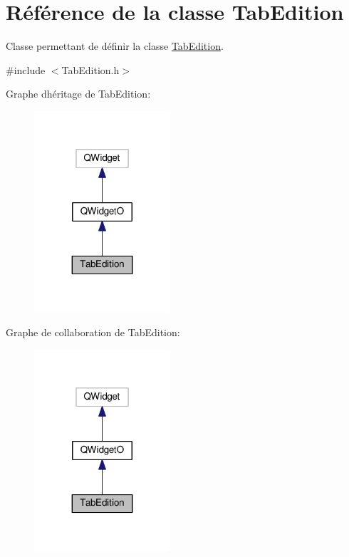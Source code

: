 \hypertarget{class_tab_edition}{}\section{Référence de la classe Tab\+Edition}
\label{class_tab_edition}


Classe permettant de définir la classe \hyperlink{class_tab_edition}{Tab\+Edition}.  




{\ttfamily \#include $<$Tab\+Edition.\+h$>$}



Graphe d\textquotesingle{}héritage de Tab\+Edition\+:\nopagebreak
\begin{figure}[H]
\begin{center}
\leavevmode
\includegraphics[width=143pt]{class_tab_edition__inherit__graph}
\end{center}
\end{figure}


Graphe de collaboration de Tab\+Edition\+:\nopagebreak
\begin{figure}[H]
\begin{center}
\leavevmode
\includegraphics[width=143pt]{class_tab_edition__coll__graph}
\end{center}
\end{figure}
